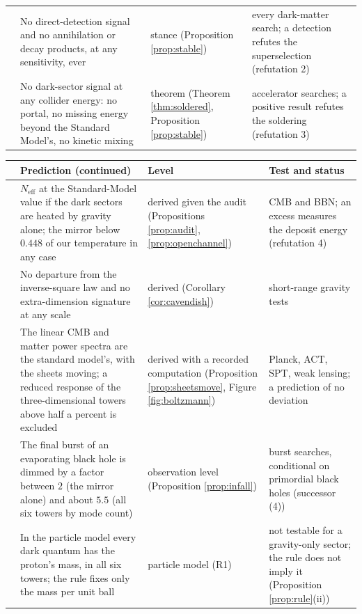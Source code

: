 \documentclass[11pt]{article}
\theoremstyle{definition}
\newcommand{\Neff}{N_{\mathrm{eff}}}
\begin{document}
\begin{center}
\begin{tabular}{>{\raggedright\arraybackslash}p{0.5cm}>{\raggedright\arraybackslash}p{5.2cm}>{\raggedright\arraybackslash}p{2.4cm}>{\raggedright\arraybackslash}p{5.6cm}}
7 & No direct-detection signal and no annihilation or decay products, at any sensitivity, ever & stance (Proposition \ref{prop:stable}) & every dark-matter search; a detection refutes the superselection (refutation 2) \\[2pt]
8 & No dark-sector signal at any collider energy: no portal, no missing energy beyond the Standard Model's, no kinetic mixing & theorem (Theorem \ref{thm:soldered}, Proposition \ref{prop:stable}) & accelerator searches; a positive result refutes the soldering (refutation 3) \\
\bottomrule
\end{tabular}
\end{center}

\begin{center}\small
\begin{tabular}{>{\raggedright\arraybackslash}p{0.5cm}>{\raggedright\arraybackslash}p{5.2cm}>{\raggedright\arraybackslash}p{2.4cm}>{\raggedright\arraybackslash}p{5.6cm}}
\toprule
& Prediction (continued) & Level & Test and status \\
\midrule
9 & $\Neff$ at the Standard-Model value if the dark sectors are heated by gravity alone; the mirror below $0.448$ of our temperature in any case & derived given the audit (Propositions \ref{prop:audit}, \ref{prop:openchannel}) & CMB and BBN; an excess measures the deposit energy (refutation 4) \\[2pt]
10 & No departure from the inverse-square law and no extra-dimension signature at any scale & derived (Corollary \ref{cor:cavendish}) & short-range gravity tests \\[2pt]
11 & The linear CMB and matter power spectra are the standard model's, with the sheets moving; a reduced response of the three-dimensional towers above half a percent is excluded & derived with a recorded computation (Proposition \ref{prop:sheetsmove}, Figure \ref{fig:boltzmann}) & Planck, ACT, SPT, weak lensing; a prediction of no deviation \\[2pt]
12 & The final burst of an evaporating black hole is dimmed by a factor between $2$ (the mirror alone) and about $5.5$ (all six towers by mode count) & observation level (Proposition \ref{prop:infall}) & burst searches, conditional on primordial black holes (successor (4)) \\[2pt]
13 & In the particle model every dark quantum has the proton's mass, in all six towers; the rule fixes only the mass per unit ball & particle model (R1) & not testable for a gravity-only sector; the rule does not imply it (Proposition \ref{prop:rule}(ii)) \\[2pt]

\end{tabular}
\end{center}
\end{document}
